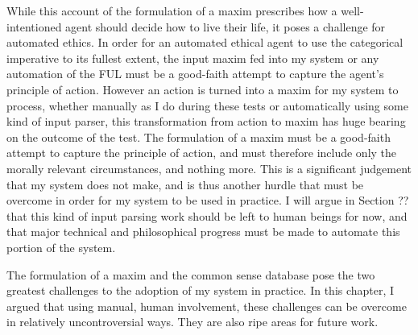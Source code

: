 \begin{isabellebody}
\begin{isamarkuptext}
While this account of the formulation of a maxim prescribes how a well-intentioned agent should
decide how to live their life, it poses a challenge for automated ethics. In order for an automated
ethical agent to use the categorical imperative to its fullest extent, the input maxim fed into
my system or any automation of the FUL must be a good-faith attempt to capture the agent's principle
of action. However an action is turned into a maxim for my system to process, whether manually as I do
during these tests or automatically using some kind of input parser, this transformation from action
to maxim has huge bearing on the outcome of the test. The formulation of a maxim must be a good-faith 
attempt to capture the principle of action, and must therefore include only the morally relevant
circumstances, and nothing more. This is a significant judgement that my system does not make, and is 
thus another hurdle that must be overcome in order for my system to be used in practice. I will argue
in Section ?? that this kind of input parsing work should be left to human beings for now, and that
major technical and philosophical progress must be made to automate this portion of the system. 

The formulation of a maxim and the common sense database pose the two greatest challenges to the adoption
of my system in practice. In this chapter, I argued that using manual, human involvement, these challenges
can be overcome in relatively uncontroversial ways. They are also ripe areas for future work.%
\end{isamarkuptext}\isamarkuptrue%
%
\isadelimdocument
%
\endisadelimdocument
%
\isatagdocument
%
\isamarkuptrue%
%
\endisatagdocument
{\isafolddocument}%
%
\isadelimdocument
%
\endisadelimdocument
%
\isadelimtheory
%
\endisadelimtheory
%
\isatagtheory
%
\endisatagtheory
{\isafoldtheory}%
%
\isadelimtheory
%
\endisadelimtheory
%
\end{isabellebody}%
\endinput
